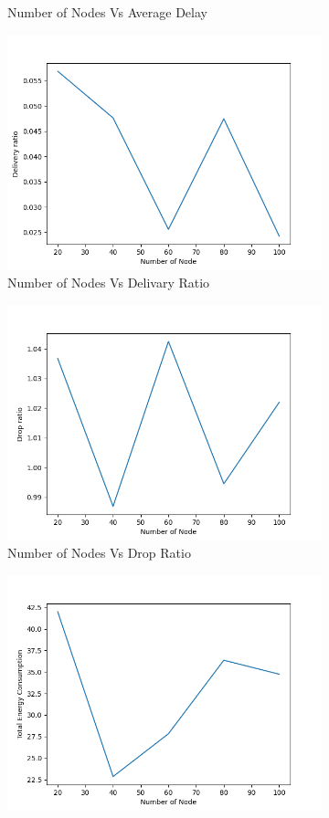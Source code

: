 \begin{figure}[h]
\begin{subfigure}{.5\textwidth}
    \caption{Number of Nodes Vs Average Delay}
     \label{node_delay}
\end{subfigure}
\begin{subfigure}{.5\textwidth}
  \centering
  \includegraphics[width=.8\linewidth]{_15_4_static/NumberofNodevsDeliveryRatio.png}
     \caption{Number of Nodes Vs Delivary Ratio}
     \label{node_delivery}
\end{subfigure}
\begin{subfigure}{.5\textwidth}
  \centering
  \includegraphics[width=.8\linewidth]{_15_4_static/NumberofNodevsDropRatio.png}
     \caption{Number of Nodes Vs Drop Ratio}
     \label{node_drop}
\end{subfigure}
\begin{subfigure}{.5\textwidth}
  \centering
  \includegraphics[width=.8\linewidth]{_15_4_static/NumberofNodevsTotalEnergyConsumption.png}

\end{subfigure}
\end{figure}
